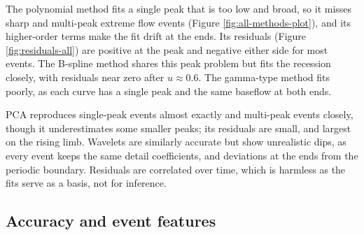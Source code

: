 \documentclass[
  11pt,
  a4paper]{article}
\begin{document}
The polynomial method fits a single peak that is too low and broad, so it misses sharp and multi-peak extreme flow events (Figure \ref{fig:all-methods-plot}), and its higher-order terms make the fit drift at the ends. Its residuals (Figure \ref{fig:residuals-all}) are positive at the peak and negative either side for most events. The B-spline method shares this peak problem but fits the recession closely, with residuals near zero after \(u \approx 0.6\). The gamma-type method fits poorly, as each curve has a single peak and the same baseflow at both ends.

PCA reproduces single-peak events almost exactly and multi-peak events closely, though it underestimates some smaller peaks; its residuals are small, and largest on the rising limb. Wavelets are similarly accurate but show unrealistic dips, as every event keeps the same detail coefficients, and deviations at the ends from the periodic boundary. Residuals are correlated over time, which is harmless as the fits serve as a basis, not for inference.

\subsection{Accuracy and event features}\label{cmp-accuracy}
\end{document}
